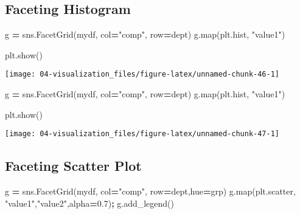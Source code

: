 \documentclass[
]{book}
\newenvironment{Shaded}{\begin{snugshade}}{\end{snugshade}}
\newcommand{\BuiltInTok}[1]{#1}
\newcommand{\FloatTok}[1]{\textcolor[rgb]{0.06,0.06,0.06}{#1}}
\newcommand{\NormalTok}[1]{#1}
\newcommand{\OperatorTok}[1]{\textcolor[rgb]{0.43,0.43,0.43}{\textbf{#1}}}
\newcommand{\StringTok}[1]{\textcolor[rgb]{0.5,0.5,0.5}{#1}}
\begin{document}
\hypertarget{faceting-histogram}{%
\subsection{Faceting Histogram}\label{faceting-histogram}}

\begin{Shaded}
\begin{Highlighting}[]
\NormalTok{g }\OperatorTok{=}\NormalTok{ sns.FacetGrid(mydf, col}\OperatorTok{=}\StringTok{"comp"}\NormalTok{, row}\OperatorTok{=}\StringTok{\textquotesingle{}dept\textquotesingle{}}\NormalTok{)}
\NormalTok{g.}\BuiltInTok{map}\NormalTok{(plt.hist, }\StringTok{"value1"}\NormalTok{)}
\end{Highlighting}
\end{Shaded}

\begin{Shaded}
\begin{Highlighting}[]
\NormalTok{plt.show()}
\end{Highlighting}
\end{Shaded}

\texttt{[image: 04-visualization\_files/figure-latex/unnamed-chunk-46-1]}

\begin{Shaded}
\begin{Highlighting}[]
\NormalTok{g }\OperatorTok{=}\NormalTok{ sns.FacetGrid(mydf, col}\OperatorTok{=}\StringTok{"comp"}\NormalTok{, row}\OperatorTok{=}\StringTok{\textquotesingle{}dept\textquotesingle{}}\NormalTok{)}
\NormalTok{g.}\BuiltInTok{map}\NormalTok{(plt.hist, }\StringTok{"value1"}\NormalTok{)}
\end{Highlighting}
\end{Shaded}

\begin{Shaded}
\begin{Highlighting}[]
\NormalTok{plt.show()}
\end{Highlighting}
\end{Shaded}

\texttt{[image: 04-visualization\_files/figure-latex/unnamed-chunk-47-1]}

\hypertarget{faceting-scatter-plot}{%
\subsection{Faceting Scatter Plot}\label{faceting-scatter-plot}}

\begin{Shaded}
\begin{Highlighting}[]
\NormalTok{g }\OperatorTok{=}\NormalTok{ sns.FacetGrid(mydf, col}\OperatorTok{=}\StringTok{"comp"}\NormalTok{, row}\OperatorTok{=}\StringTok{\textquotesingle{}dept\textquotesingle{}}\NormalTok{,hue}\OperatorTok{=}\StringTok{\textquotesingle{}grp\textquotesingle{}}\NormalTok{)}
\NormalTok{g.}\BuiltInTok{map}\NormalTok{(plt.scatter, }\StringTok{"value1"}\NormalTok{,}\StringTok{"value2"}\NormalTok{,alpha}\OperatorTok{=}\FloatTok{0.7}\NormalTok{)}\OperatorTok{;}
\NormalTok{g.add\_legend()}
\end{Highlighting}
\end{Shaded}
\end{document}
